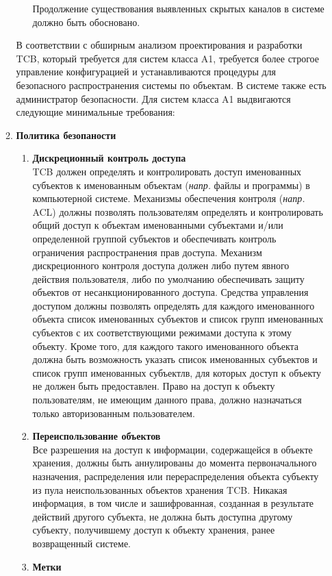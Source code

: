 \begin{enumerate}
\begin{enumerate}
\begin{itemize}
			Продолжение существования выявленных скрытых каналов в системе должно быть обосновано.
		\end{itemize}
		В соответствии с обширным анализом проектирования и разработки TCB, который требуется для систем класса A1, требуется более строгое управление конфигурацией и устанавливаются 
		процедуры для безопасного распространения системы по объектам. В системе также есть администратор безопасности. Для систем класса A1 выдвигаются следующие минимальные требования:
		\item{\textbf{Политика безопаности}}
		\begin{enumerate}
			\item{\textbf{Дискреционный контроль доступа}}\\
			TCB должен определять и контролировать доступ именованных субъектов к именованным объектам (\textit{напр.} файлы и программы) в компьютерной системе. Механизмы обеспечения контроля
			(\textit{напр.} ACL) должны позволять пользователям определять и контролировать общий доступ к объектам именованными субъектами и/или определенной группой субъектов и обеспечивать 
			контроль ограничения распространения прав доступа. Механизм дискреционного контроля доступа должен либо путем явного действия пользователя, либо по умолчанию обеспечивать защиту 
			объектов от несанкционированного доступа. Средства управления доступом должны позволять определять для каждого именованного объекта список именованных субъектов и список групп 
			именованных субъектов с их соответствующими режимами доступа к этому объекту. Кроме того, для каждого такого именованного объекта должна быть возможность указать список
			именованных субъектов и список групп именованных субъектлв, для которых доступ к объекту не должен быть предоставлен. Право на доступ к объекту пользователям, не имеющим 
			данного права, должно назначаться только авторизованным пользователем.
			\item{\textbf{Переиспользование объектов}}\\
			Все разрешения на доступ к информации, содержащейся в объекте хранения, должны быть аннулированы до момента первоначального назначения, распределения или перераспределения объекта
			субъекту из пула неиспользованных объектов хранения TCB. Никакая информация, в том числе и зашифрованная, созданная в результате действий другого субъекта, не должна быть доступна
			другому субъекту, получившему доступ к объекту хранения, ранее возвращенный системе.
			\item{\textbf{Метки}}\\

\end{enumerate}
\end{enumerate}
\end{enumerate}
